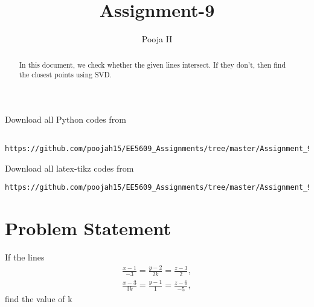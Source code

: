 \documentclass[journal,12pt,twocolumn]{IEEEtran}
\begin{document}
\let\vec\mathbf
\renewcommand{\thefigure}{\theproblem}
\def\putbox#1#2#3{\makebox[0in][l]{\makebox[#1][l]{}\raisebox{\baselineskip}[0in][0in]{\raisebox{#2}[0in][0in]{#3}}}}
     \def\rightbox#1{\makebox[0in][r]{#1}}
     \def\centbox#1{\makebox[0in]{#1}}
     \def\topbox#1{\raisebox{-\baselineskip}[0in][0in]{#1}}
     \def\midbox#1{\raisebox{-0.5\baselineskip}[0in][0in]{#1}}
\vspace{3cm}
\title{Assignment-9}
\author{Pooja H \\ }
\maketitle
\newpage
\bigskip
\renewcommand{\thefigure}{\theenumi}
\renewcommand{\thetable}{\theenumi}
\begin{abstract}
In this document, we check whether the given lines intersect. If they don't, then find the closest points using SVD.
\end{abstract}
Download all Python codes from 
\begin{lstlisting}
	https://github.com/poojah15/EE5609_Assignments/tree/master/Assignment_9
\end{lstlisting}
Download all latex-tikz codes from 
\begin{lstlisting}
https://github.com/poojah15/EE5609_Assignments/tree/master/Assignment_9
\end{lstlisting}
\section{Problem Statement}
If the lines
\begin{align}
	\frac{x - 1}{-3} = \frac{y - 2}{2k} = \frac{z - 3}{2},\\
	\frac{x - 3}{3k} = \frac{y - 1}{1} = \frac{z - 6}{-5},
\end{align}
find the value of k
\end{document}
